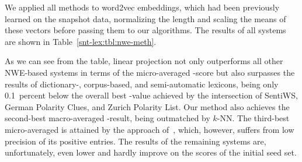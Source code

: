We applied all methods to word2vec embeddings, which had been
previously learned on the snapshot data, normalizing the length and
scaling the means of these vectors before passing them to our
algorithms.  The results of all systems are shown in
Table~\ref{snt-lex:tbl:nwe-meth}.

As we can see from the table, linear projection not only outperforms
all other NWE-based systems in terms of the micro-averaged \F-score
but also surpasses the results of dictionary-, corpus-based, and
semi-automatic lexicons, being only 0.1~percent below the overall best
\F-value achieved by the intersection of SentiWS, German Polarity
Clues, and Zurich Polarity List.  Our method also achieves the
second-best macro-averaged \F-result, being outmatched by $k$-NN.  The
third-best micro-averaged \F{} is attained by the approach
of~\citet{Tang:14a}, which, however, suffers from low precision of its
positive entries.  The results of the remaining systems are,
unfortunately, even lower and hardly improve on the scores of the
initial seed set.

